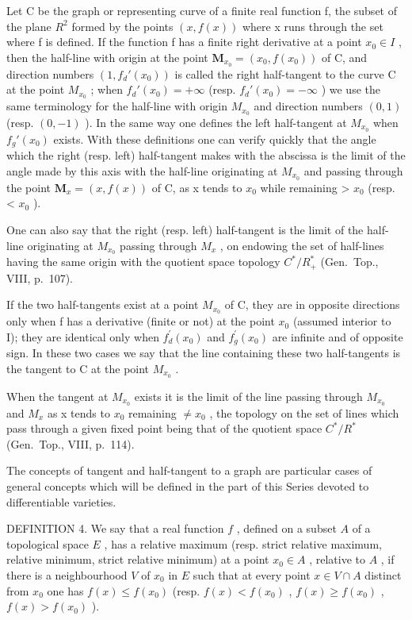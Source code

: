 Let C be the graph or representing curve of a finite real function f, the subset of the plane \(R^{2}\) formed by the points \((x, f(x))\) where x runs through the set where f is defined. If the function f has a finite right derivative at a point \(x_{0} \in I\) , then the half-line with origin at the point \(\mathbf{M}_{x_{0}} = (x_{0}, f(x_{0}))\) of C, and direction numbers \((1, f_{d}'(x_{0}))\) is called the right half-tangent to the curve C at the point \(M_{x_{0}}\) ; when \(f_{d}'(x_{0}) = +\infty\) (resp. \(f_{d}'(x_{0}) = -\infty\) ) we use the same terminology for the half-line with origin \(M_{x_{0}}\) and direction numbers \((0, 1)\) (resp. \((0, -1)\) ). In the same way one defines the left half-tangent at \(M_{x_{0}}\) when \(f_{g}'(x_{0})\) exists. With these definitions one can verify quickly that the angle which the right (resp. left) half-tangent makes with the abscissa is the limit of the angle made by this axis with the half-line originating at \(M_{x_{0}}\) and passing through the point \(\mathbf{M}_{x} = (x, f(x))\) of C, as x tends to \(x_{0}\) while remaining \textgreater{} \(x_{0}\) (resp. \textless{} \(x_{0}\) ).

One can also say that the right (resp. left) half-tangent is the limit of the half-line originating at \(M_{x_{0}}\) passing through \(M_{x}\) , on endowing the set of half-lines having the same origin with the quotient space topology \(C^{*}/R_{+}^{*}\) (Gen.~Top., VIII, p.~107).

If the two half-tangents exist at a point \(M_{x_{0}}\) of C, they are in opposite directions only when f has a derivative (finite or not) at the point \(x_{0}\) (assumed interior to I); they are identical only when \(f_{d}^{\prime}(x_{0})\) and \(f_{g}^{\prime}(x_{0})\) are infinite and of opposite sign. In these two cases we say that the line containing these two half-tangents is the tangent to C at the point \(M_{x_{0}}\) .

When the tangent at \(M_{x_{0}}\) exists it is the limit of the line passing through \(M_{x_{0}}\) and \(M_{x}\) as x tends to \(x_{0}\) remaining \(\neq x_{0}\) , the topology on the set of lines which pass through a given fixed point being that of the quotient space \(C^{*}/R^{*}\) (Gen.~Top., VIII, p.~114).

The concepts of tangent and half-tangent to a graph are particular cases of general concepts which will be defined in the part of this Series devoted to differentiable varieties.

DEFINITION 4. We say that a real function \(f\) , defined on a subset \(A\) of a topological space \(E\) , has a relative maximum (resp. strict relative maximum, relative minimum, strict relative minimum) at a point \(x_0 \in A\) , relative to \(A\) , if there is a neighbourhood \(V\) of \(x_0\) in \(E\) such that at every point \(x \in V \cap A\) distinct from \(x_0\) one has \(f(x) \leqslant f(x_0)\) (resp. \(f(x) < f(x_0)\) , \(f(x) \geqslant f(x_0)\) , \(f(x) > f(x_0)\) ).

